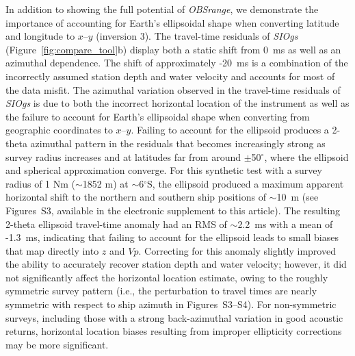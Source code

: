 In addition to showing the full potential of \textit{OBSrange}, we demonstrate the importance of accounting for Earth's ellipsoidal shape when converting latitude and longitude to $x$--$y$ (inversion 3). The travel-time residuals of \textit{SIOgs} (Figure~\ref{fig:compare_tool}b) display both a static shift from 0~ms as well as an azimuthal dependence. The shift of approximately -20~ms is a combination of the incorrectly assumed station depth and water velocity and accounts for most of the data misfit. The azimuthal variation observed in the travel-time residuals of \textit{SIOgs} is due to both the incorrect horizontal location of the instrument as well as the failure to account for Earth's ellipsoidal shape when converting from geographic coordinates to $x$--$y$. Failing to account for the ellipsoid produces a 2-theta azimuthal pattern in the residuals that becomes increasingly strong as survey radius increases and at latitudes far from around $\pm$50$^{\circ}$, where the ellipsoid and spherical approximation converge. For this synthetic test with a survey radius of 1 Nm ($\sim$1852 m) at $\sim$6$^{\circ}$S, the ellipsoid produced a maximum apparent horizontal shift to the northern and southern ship positions of $\sim$10~m (see Figures~S3, available in the electronic supplement to this article). The resulting 2-theta ellipsoid travel-time anomaly had an RMS of $\sim$2.2~ms with a mean of -1.3~ms, indicating that failing to account for the ellipsoid leads to small biases that map directly into $z$ and $Vp$. Correcting for this anomaly slightly improved the ability to accurately recover station depth and water velocity; however, it did not significantly affect the horizontal location estimate, owing to the roughly symmetric survey pattern (i.e., the perturbation to travel times are nearly symmetric with respect to ship azimuth in Figures~S3--S4). For non-symmetric surveys, including those with a strong back-azimuthal variation in good acoustic returns, horizontal location biases resulting from improper ellipticity corrections may be more significant.

